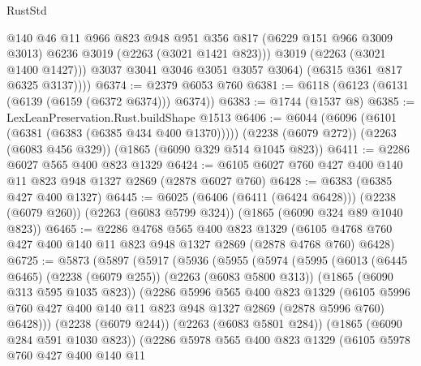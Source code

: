\begin{lexlean}{RustStd}
\begin{coremodule}
                @140
                @46
                @11
                @966
                @823
                @948
                @951
                @356
                @817
                (@6229 @151 @966 @3009 @3013)
                @6236
                @3019
                (@2263 (@3021 @1421 @823)))
              @3019
              (@2263 (@3021 @1400 @1427)))
            @3037
            @3041
            @3046
            @3051
            @3057
            @3064)
          (@6315 @361 @817 @6325 @3137))))
@6374 := @2379 @6053 @760
@6381 := @6118 (@6123 (@6131 (@6139 (@6159 (@6372 @6374))) @6374))
@6383 := @1744 (@1537 @8)
@6385 := LexLeanPreservation.Rust.buildShape @1513
@6406 := @6044
    (@6096 (@6101 (@6381 (@6383 (@6385 @434 @400 @1370)))))
    (@2238 (@6079 @272))
    (@2263 (@6083 @456 @329))
    (@1865 (@6090 @329 @514 @1045 @823))
@6411 := @2286 @6027 @565 @400 @823 @1329
@6424 := @6105 @6027 @760 @427 @400 @140 @11 @823 @948 @1327 @2869 (@2878 @6027 @760)
@6428 := @6383 (@6385 @427 @400 @1327)
@6445 := @6025
    (@6406 (@6411 (@6424 @6428)))
    (@2238 (@6079 @260))
    (@2263 (@6083 @5799 @324))
    (@1865 (@6090 @324 @89 @1040 @823))
@6465 := @2286
    @4768
    @565
    @400
    @823
    @1329
    (@6105 @4768 @760 @427 @400 @140 @11 @823 @948 @1327 @2869 (@2878 @4768 @760) @6428)
@6725 := @5873
    (@5897
      (@5917
        (@5936
          (@5955
            (@5974
              (@5995
                (@6013
                  (@6445 @6465)
                  (@2238 (@6079 @255))
                  (@2263 (@6083 @5800 @313))
                  (@1865 (@6090 @313 @595 @1035 @823))
                  (@2286
                    @5996
                    @565
                    @400
                    @823
                    @1329
                    (@6105
                      @5996
                      @760
                      @427
                      @400
                      @140
                      @11
                      @823
                      @948
                      @1327
                      @2869
                      (@2878 @5996 @760)
                      @6428)))
                (@2238 (@6079 @244))
                (@2263 (@6083 @5801 @284))
                (@1865 (@6090 @284 @591 @1030 @823))
                (@2286
                  @5978
                  @565
                  @400
                  @823
                  @1329
                  (@6105
                    @5978
                    @760
                    @427
                    @400
                    @140
                    @11

\end{coremodule}
\end{lexlean}
